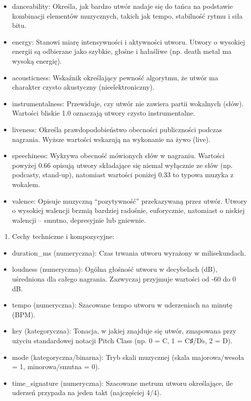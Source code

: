 \documentclass[
]{article}
\providecommand{\tightlist}{%
  \setlength{\itemsep}{0pt}\setlength{\parskip}{0pt}}
\begin{document}
\begin{itemize}
\item
  danceability: Określa, jak bardzo utwór nadaje się do tańca na
  podstawie kombinacji elementów muzycznych, takich jak tempo,
  stabilność rytmu i siła bitu.
\item
  energy: Stanowi miarę intensywności i aktywności utworu. Utwory o
  wysokiej energii są odbierane jako szybkie, głośne i hałaśliwe (np.
  death metal ma wysoką energię).
\item
  acousticness: Wskaźnik określający pewność algorytmu, że utwór ma
  charakter czysto akustyczny (nieelektroniczny).
\item
  instrumentalness: Przewiduje, czy utwór nie zawiera partii wokalnych
  (słów). Wartości bliskie 1.0 oznaczają utwory czysto instrumentalne.
\item
  liveness: Określa prawdopodobieństwo obecności publiczności podczas
  nagrania. Wyższe wartości wskazują na wykonanie na żywo (live).
\item
  speechiness: Wykrywa obecność mówionych słów w nagraniu. Wartości
  powyżej 0.66 opisują utwory składające się niemal wyłącznie ze słów
  (np. podcasty, stand-up), natomiast wartości poniżej 0.33 to typowa
  muzyka z wokalem.
\item
  valence: Opisuje muzyczną ``pozytywność'' przekazywaną przez utwór.
  Utwory o wysokiej walencji brzmią bardziej radośnie, euforycznie,
  natomiast o niskiej walencji -- smutno, depresyjnie lub gniewnie.
\end{itemize}

\begin{enumerate}
\def\labelenumi{\arabic{enumi}.}
\setcounter{enumi}{2}
\tightlist
\item
  Cechy techniczne i kompozycyjne:
\end{enumerate}

\begin{itemize}
\item
  duration\_ms (numeryczna): Czas trwania utworu wyrażony w
  milisekundach.
\item
  loudness (numeryczna): Ogólna głośność utworu w decybelach (dB),
  uśredniona dla całego nagrania. Zazwyczaj przyjmuje wartości od -60 do
  0 dB.
\item
  tempo (numeryczna): Szacowane tempo utworu w uderzeniach na minutę
  (BPM).
\item
  key (kategoryczna): Tonacja, w jakiej znajduje się utwór, zmapowana
  przy użyciu standardowej notacji Pitch Class (np. 0 = C, 1 = C♯/D♭, 2
  = D).
\item
  mode (kategoryczna/binarna): Tryb skali muzycznej (skala
  majorowa/wesoła = 1, minorowa/smutna = 0).
\item
  time\_signature (numeryczna): Szacowane metrum utworu określające, ile
  uderzeń przypada na jeden takt (najczęściej 4/4).
\end{itemize}
\end{document}
